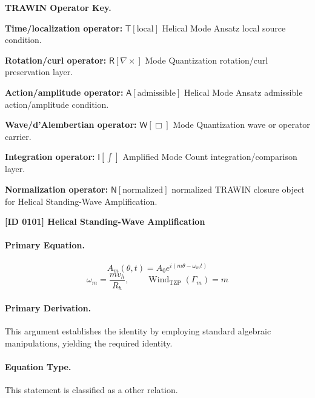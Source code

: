 \par\vspace{0.45\baselineskip}
\noindent\begin{minipage}[t]{\linewidth}
\begingroup
\small
\raggedright
\textbf{TRAWIN Operator Key.}\par
\noindent\textbf{Time/localization operator:} $\mathsf{T}\!\left[\mathrm{local}\right]$ Helical Mode Ansatz local source condition.\par
\noindent\textbf{Rotation/curl operator:} $\mathsf{R}\!\left[\nabla\times\right]$ Mode Quantization rotation/curl preservation layer.\par
\noindent\textbf{Action/amplitude operator:} $\mathsf{A}\!\left[\mathrm{admissible}\right]$ Helical Mode Ansatz admissible action/amplitude condition.\par
\noindent\textbf{Wave/d'Alembertian operator:} $\mathsf{W}\!\left[\Box\right]$ Mode Quantization wave or operator carrier.\par
\noindent\textbf{Integration operator:} $\mathsf{I}\!\left[\int\right]$ Amplified Mode Count integration/comparison layer.\par
\noindent\textbf{Normalization operator:} $\mathsf{N}\!\left[\mathrm{normalized}\right]$ normalized TRAWIN closure object for Helical Standing-Wave Amplification.\par
\endgroup
\end{minipage}

\clearpage
\noindent\textbf{[ID 0101] Helical Standing-Wave Amplification}\par
\vspace{0.35em}
\paragraph{Primary Equation.}
\[
A_m(\theta,t)=A_0 e^{i(m\theta-\omega_m t)}
\]
\[
\omega_m = \frac{m v_h}{R_h},
\qquad
\operatorname{Wind}_{\mathrm{TZP}}(\Gamma_m)=m
\]

\paragraph{Primary Derivation.}
This argument establishes the identity by employing standard algebraic manipulations, yielding the required identity.
\paragraph{Equation Type.}
This statement is classified as a other relation.

